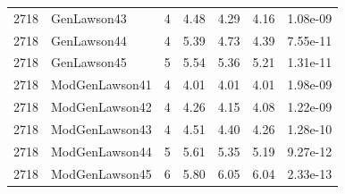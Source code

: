 \begin{table}[p]
\begin{tabular}{@{}llcccc c@{}}
2718 & GenLawson43 & 4 & 4.48 & 4.29 & 4.16 & 1.08e-09\\
2718 & GenLawson44 & 4 & 5.39 & 4.73 & 4.39 & 7.55e-11\\
2718 & GenLawson45 & 5 & 5.54 & 5.36 & 5.21 & 1.31e-11\\
2718 & ModGenLawson41 & 4 & 4.01 & 4.01 & 4.01 & 1.98e-09\\
2718 & ModGenLawson42 & 4 & 4.26 & 4.15 & 4.08 & 1.22e-09\\
2718 & ModGenLawson43 & 4 & 4.51 & 4.40 & 4.26 & 1.28e-10\\
2718 & ModGenLawson44 & 5 & 5.61 & 5.35 & 5.19 & 9.27e-12\\
2718 & ModGenLawson45 & 6 & 5.80 & 6.05 & 6.04 & 2.33e-13\\
\bottomrule
\end{tabular}
\end{table}
